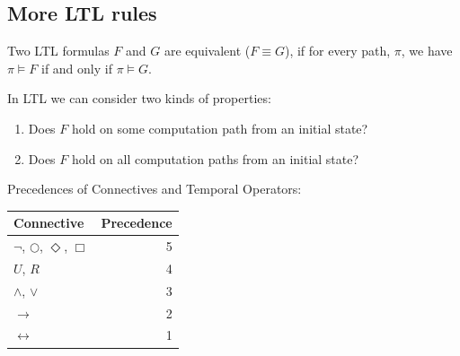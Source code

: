 \documentclass[11pt,a4paper]{article}
\begin{document}
\subsection{More LTL rules}

Two LTL formulas $F$ and $G$ are equivalent ($F \equiv G$), if for every path, $\pi$, we have $\pi \models F$ if and only if $\pi \models G$.

In LTL we can consider two kinds of properties:
\begin{enumerate}
\item Does $F$ hold on some computation path from an initial state?
\item Does $F$ hold on all computation paths from an initial state?
\end{enumerate}

Precedences of Connectives and Temporal Operators:

\begin{tabular}{l | r}
Connective & Precedence \\
\hline
$\neg$, $\bigcirc$, $\Diamond$, $\Box$ & 5 \\
$U$, $R$ & 4 \\
$\wedge$, $\vee$ & 3 \\
$\rightarrow$ & 2 \\
$\leftrightarrow$ & 1 \\
\end{tabular}
\end{document}
